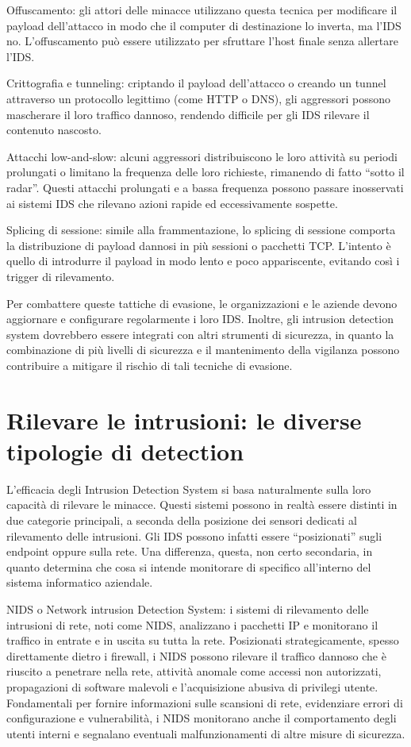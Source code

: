 Offuscamento: gli attori delle minacce utilizzano questa tecnica per modificare il payload dell’attacco in modo che il computer di destinazione lo inverta, ma l’IDS no. L’offuscamento può essere utilizzato per sfruttare l’host finale senza allertare l’IDS.

Crittografia e tunneling: criptando il payload dell’attacco o creando un tunnel attraverso un protocollo legittimo (come HTTP o DNS), gli aggressori possono mascherare il loro traffico dannoso, rendendo difficile per gli IDS rilevare il contenuto nascosto.

Attacchi low-and-slow: alcuni aggressori distribuiscono le loro attività su periodi prolungati o limitano la frequenza delle loro richieste, rimanendo di fatto “sotto il radar”. Questi attacchi prolungati e a bassa frequenza possono passare inosservati ai sistemi IDS che rilevano azioni rapide ed eccessivamente sospette.

Splicing di sessione: simile alla frammentazione, lo splicing di sessione comporta la distribuzione di payload dannosi in più sessioni o pacchetti TCP. L’intento è quello di introdurre il payload in modo lento e poco appariscente, evitando così i trigger di rilevamento.

Per combattere queste tattiche di evasione, le organizzazioni e le aziende devono aggiornare e configurare regolarmente i loro IDS. Inoltre, gli intrusion detection system dovrebbero essere integrati con altri strumenti di sicurezza, in quanto la combinazione di più livelli di sicurezza e il mantenimento della vigilanza possono contribuire a mitigare il rischio di tali tecniche di evasione.


\section{Rilevare le intrusioni: le diverse tipologie di detection}

L’efficacia degli Intrusion Detection System si basa naturalmente sulla loro capacità di rilevare le minacce. Questi sistemi possono in realtà essere distinti in due categorie principali, a seconda della posizione dei sensori dedicati al rilevamento delle intrusioni. Gli IDS possono infatti essere “posizionati” sugli endpoint oppure sulla rete. Una differenza, questa, non certo secondaria, in quanto determina che cosa si intende monitorare di specifico all’interno del sistema informatico aziendale.

NIDS o Network intrusion Detection System: i sistemi di rilevamento delle intrusioni di rete, noti come NIDS, analizzano i pacchetti IP e monitorano il traffico in entrate e in uscita su tutta la rete. Posizionati strategicamente, spesso direttamente dietro i firewall, i NIDS possono rilevare il traffico dannoso che è riuscito a penetrare nella rete, attività anomale come accessi non autorizzati, propagazioni di software malevoli e l’acquisizione abusiva di privilegi utente. Fondamentali per fornire informazioni sulle scansioni di rete, evidenziare errori di configurazione e vulnerabilità, i NIDS monitorano anche il comportamento degli utenti interni e segnalano eventuali malfunzionamenti di altre misure di sicurezza.


